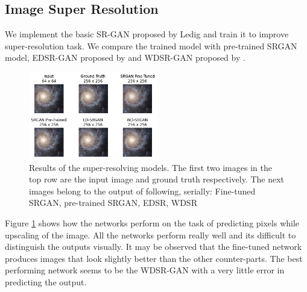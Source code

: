 \documentclass{article} %
\begin{document}
    \subsection{Image Super Resolution}
    \hspace*{0.25 in}We implement the basic SR-GAN proposed by Ledig and train it to improve super-resolution task. We compare the trained model with pre-trained SRGAN model, EDSR-GAN proposed by \cite{lim2017enhanced} and WDSR-GAN proposed by \cite{yu2018wide}.
    \begin{figure}[!htb]
    \centering
    	\includegraphics[width=0.5\textwidth]{figures/comparison_upscale}
    	\caption{Results of the super-resolving models. The first two images in the top row are the input image and ground truth respectively. The next images belong to the output of following, serially: Fine-tuned SRGAN, pre-trained SRGAN, EDSR, WDSR}
    	\label{fig: sr_results}
    \end{figure}
    Figure \ref{fig: sr_results} shows how the networks perform on the task of predicting pixels while upscaling of the image. All the networks perform really well and its difficult to distinguish the outputs visually. It may be observed that the fine-tuned network produces images that look slightly better than the other counter-parts. The best performing network seems to be the WDSR-GAN with a very little error in predicting the output. 
\end{document}
